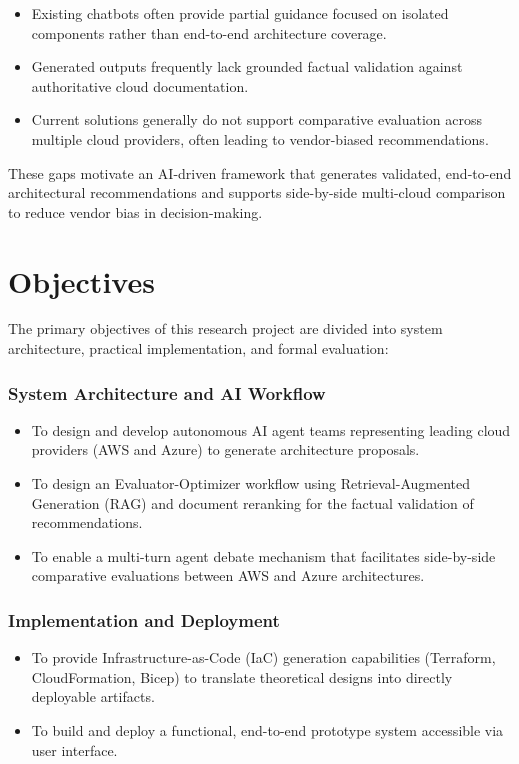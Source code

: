 \begin{itemize}
    \item Existing chatbots often provide partial guidance focused on isolated components rather than end-to-end architecture coverage.
    \item Generated outputs frequently lack grounded factual validation against authoritative cloud documentation.
    \item Current solutions generally do not support comparative evaluation across multiple cloud providers, often leading to vendor-biased recommendations.
\end{itemize}

These gaps motivate an AI-driven framework that generates validated, end-to-end architectural recommendations and supports side-by-side multi-cloud comparison to reduce vendor bias in decision-making. %

\section{Objectives}

The primary objectives of this research project are divided into system architecture, practical implementation, and formal evaluation:

\subsubsection*{System Architecture and AI Workflow}
\begin{itemize}
    \item To design and develop autonomous AI agent teams representing leading cloud providers (AWS and Azure) to generate architecture proposals.
    \item To design an Evaluator-Optimizer workflow using Retrieval-Augmented Generation (RAG) and document reranking for the factual validation of recommendations.
    \item To enable a multi-turn agent debate mechanism that facilitates side-by-side comparative evaluations between AWS and Azure architectures.
\end{itemize}

\subsubsection*{Implementation and Deployment}
\begin{itemize}
    \item To provide Infrastructure-as-Code (IaC) generation capabilities (Terraform, CloudFormation, Bicep) to translate theoretical designs into directly deployable artifacts.
    \item To build and deploy a functional, end-to-end prototype system accessible via user interface.
\end{itemize}

